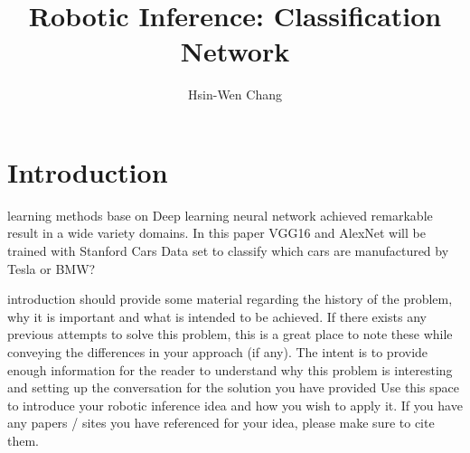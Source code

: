 \documentclass[10pt,journal,compsoc]{IEEEtran}
\begin{document}
\title{Robotic Inference: Classification Network}

\author{Hsin-Wen Chang}

%
{}


\maketitle
\IEEEdisplaynontitleabstractindextext
\IEEEpeerreviewmaketitle
\section{Introduction}
\label{sec:introduction}

 learning methods base on Deep learning neural network achieved remarkable result in a wide variety domains. In this paper VGG16 and AlexNet will be trained with Stanford Cars Data set to classify which cars are manufactured by Tesla or BMW? 

introduction should provide some material regarding the history of the problem, why it is important and what is intended to be achieved. If there exists any previous attempts to solve this problem, this is a great place to note these while conveying the differences in your approach (if any). The intent is to provide enough information for the reader to understand why this problem is interesting and setting up the conversation for the solution you have provided
Use this space to introduce your robotic inference idea and how you wish to apply it. 
If you have any papers / sites you have referenced for your idea, please make sure to cite them.
\end{document}
